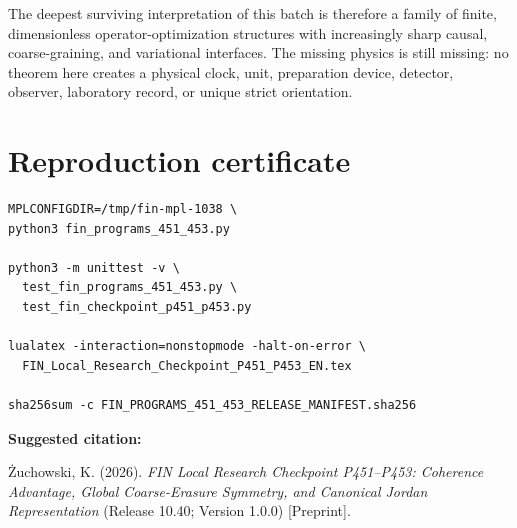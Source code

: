 \documentclass[11pt,a4paper,openany]{report}
\begin{document}
The deepest surviving interpretation of this batch is therefore a family of finite, dimensionless operator-optimization structures with increasingly sharp causal, coarse-graining, and variational interfaces. The missing physics is still missing: no theorem here creates a physical clock, unit, preparation device, detector, observer, laboratory record, or unique strict orientation.


\clearpage
\chapter*{Reproduction certificate}
\begin{Verbatim}[fontsize=\small]
MPLCONFIGDIR=/tmp/fin-mpl-1038 \
python3 fin_programs_451_453.py

python3 -m unittest -v \
  test_fin_programs_451_453.py \
  test_fin_checkpoint_p451_p453.py

lualatex -interaction=nonstopmode -halt-on-error \
  FIN_Local_Research_Checkpoint_P451_P453_EN.tex

sha256sum -c FIN_PROGRAMS_451_453_RELEASE_MANIFEST.sha256
\end{Verbatim}

\noindent\textbf{Suggested citation:}

\.Zuchowski, K. (2026). \emph{FIN Local Research Checkpoint P451--P453:
Coherence Advantage, Global Coarse-Erasure Symmetry, and Canonical Jordan
Representation} (Release 10.40; Version 1.0.0) [Preprint].
\end{document}
